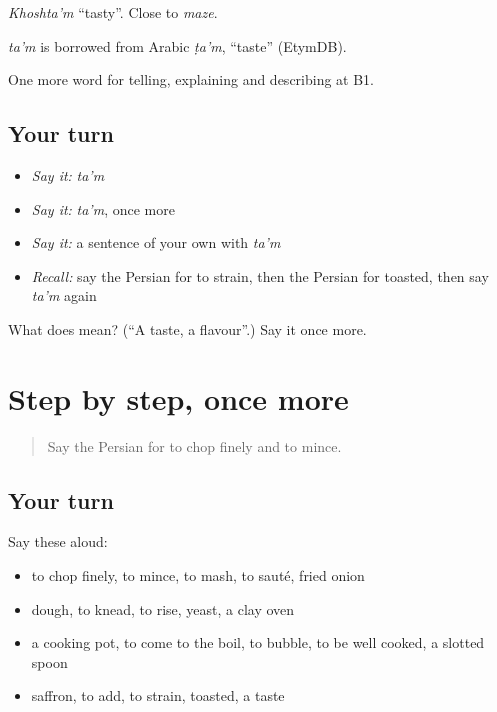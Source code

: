 \emph{Khoshta'm} \textquotedblleft{}tasty\textquotedblright{}. Close to \emph{maze}.

\begin{cousinweb}
\emph{ta'm} is borrowed from Arabic \emph{ṭa'm}, \textquotedblleft{}taste\textquotedblright{} (EtymDB).
\end{cousinweb}

\begin{grammarlens}[title={What you've built}]
One more word for telling, explaining and describing at B1.
\end{grammarlens}

\subsection*{Your turn}
\begin{itemize}
\raggedright
  \item \emph{Say it:} \emph{ta'm}
  \item \emph{Say it:} \emph{ta'm}, once more
  \item \emph{Say it:} a sentence of your own with \emph{ta'm}
  \item \emph{Recall:} say the Persian for to strain, then the Persian for toasted, then say \emph{ta'm} again
\end{itemize}

\begin{tcolorbox}[breakable,colback=teal!4,colframe=teal!35!black,title={Before you move on}]
What does  mean? (\textquotedblleft{}A taste, a flavour\textquotedblright{}.) Say it once more.
\end{tcolorbox}
\section[(dialogue)]{Step by step, once more}

\label{lesson:FA-R359-review-356-359}



\begin{quote}
Say the Persian for to chop finely and to mince.
\end{quote}

\subsection*{Your turn}
Say these aloud:

\begin{itemize}
\raggedright
  \item to chop finely, to mince, to mash, to sauté, fried onion
  \item dough, to knead, to rise, yeast, a clay oven
  \item a cooking pot, to come to the boil, to bubble, to be well cooked, a slotted spoon
  \item saffron, to add, to strain, toasted, a taste
\end{itemize}

